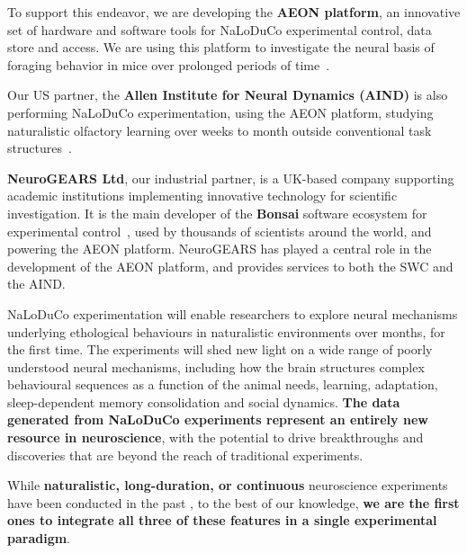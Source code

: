 To support this endeavor, we are developing the \textbf{AEON platform}, an
innovative set of hardware and software tools for NaLoDuCo experimental
control, data store and access. We are using this platform to investigate the
neural basis of foraging behavior in mice over prolonged periods of
time~\citep{campagnerEtAl24}.

Our US partner, the \textbf{Allen Institute for Neural Dynamics (AIND)} is also
performing NaLoDuCo experimentation, using the AEON platform, studying
naturalistic olfactory learning over weeks to month outside conventional task
structures~\citep{finkEtAl24}.

\textbf{NeuroGEARS Ltd}, our industrial partner, is a UK-based company
supporting academic institutions implementing innovative technology for
scientific investigation.
%
It is the main developer of the \textbf{Bonsai} software ecosystem for
experimental control~\citep{lopesEtAl15}, used by thousands of scientists
around the world, and powering the AEON platform.
%
NeuroGEARS  has played a central role in the development of the AEON platform,
and provides services to both the SWC and the AIND.

NaLoDuCo experimentation will enable researchers to explore neural mechanisms
underlying ethological behaviours in naturalistic environments over months, for
the first time.  The experiments will shed new light on a wide range of poorly
understood neural mechanisms, including how the brain structures complex
behavioural sequences as a function of the animal needs, learning, adaptation,
sleep-dependent memory consolidation and social dynamics.
%
\textbf{The data generated from NaLoDuCo experiments represent an entirely new
resource in neuroscience}, with the potential to drive breakthroughs and
discoveries that are beyond the reach of traditional experiments.


While \textbf{naturalistic, long-duration, or continuous} neuroscience experiments have
been conducted in the past
\citep{nagyEtAl23,hoEtAl23,rayEtAl25,weissbrodEtAl13,dhawaleEtAl17,newmanEtAl24}, to the
best of our knowledge, \textbf{we are the first ones to integrate all three of these
features in a single experimental paradigm}.
%

